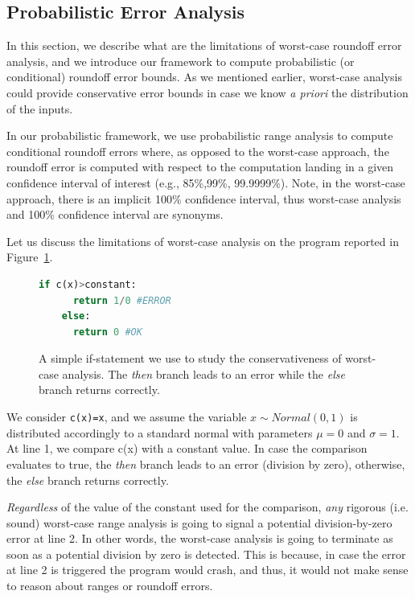 %
%  
%  
%
%
%
%
\subsection{Probabilistic Error Analysis}
\label{sec:prob}
%
In this section, we describe what are the limitations of worst-case roundoff error analysis, and we introduce our framework to compute probabilistic (or conditional) roundoff error bounds.
%
As we mentioned earlier, worst-case analysis could provide conservative error bounds in case we know \emph{a priori} the distribution of the inputs. 
%
%

In our probabilistic framework, we use probabilistic range analysis to compute conditional roundoff errors where, as opposed to the worst-case approach, the roundoff error is computed with respect to the computation landing in a given confidence interval of interest (e.g., 85\%,99\%, 99.9999\%).
%
Note, in the worst-case approach, there is an implicit 100\% confidence interval, thus worst-case analysis and 100\% confidence interval are synonyms.
%

%
Let us discuss the limitations of worst-case analysis on the program reported in Figure~\ref{fig:prob}.
%
\begin{figure}[tb!]
	\begin{lstlisting}[frame=single, language=Python]
	if c(x)>constant:
	  return 1/0 #ERROR
	else:
	  return 0 #OK
	\end{lstlisting}
	\caption{A simple if-statement we use to study the conservativeness of worst-case analysis. The \emph{then} branch leads to an error while the \emph{else} branch returns correctly.}
	\label{fig:prob}
\end{figure}
%
We consider \lstinline{c(x)=x}, and we assume the variable $x\sim Normal(0,1)$ is distributed accordingly to a standard normal with parameters $\mu = 0$ and $\sigma = 1$.
%
At line 1, we compare c(x) with a constant value.
%
In case the comparison evaluates to true, the \emph{then} branch leads to an error (division by zero), otherwise, the \emph{else} branch returns correctly.
%

\emph{Regardless} of the value of the constant used for the comparison, \emph{any} rigorous (i.e. sound) worst-case range analysis is going to signal a potential division-by-zero error at line 2.
%
In other words, the worst-case analysis is going to terminate as soon as a potential division by zero is detected.
%
This is because, in case the error at line 2 is triggered the program would crash, and thus, it would not make sense to reason about ranges or roundoff errors.

